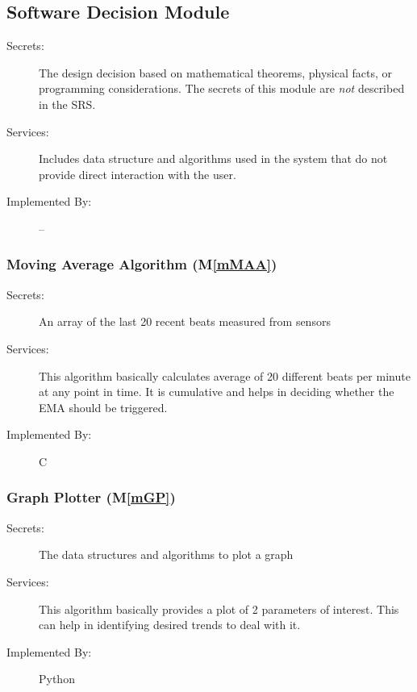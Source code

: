 \documentclass[12pt, titlepage]{article}
\newcommand{\mref}[1]{M\ref{#1}}
\begin{document}
\subsection{Software Decision Module}

\begin{description}
  \item[Secrets:] The design decision based on mathematical theorems, physical
    facts, or programming considerations. The secrets of this module are
    \emph{not} described in the SRS.
  \item[Services:] Includes data structure and algorithms used in the system that
    do not provide direct interaction with the user.
  \item[Implemented By:] --
\end{description}



\subsubsection{Moving Average Algorithm (\mref{mMAA})}

\begin{description}
  \item[Secrets:] An array of the last 20 recent beats measured from sensors
  \item[Services:] This algorithm basically calculates average of 20 different beats per minute at any point in time. It is cumulative and helps in deciding whether the EMA should be triggered.
  \item[Implemented By:] C
\end{description}

\subsubsection{Graph Plotter (\mref{mGP})}

\begin{description}
  \item[Secrets:] The data structures and algorithms to plot a graph
  \item[Services:] This algorithm basically provides a plot of 2 parameters of interest. This can help in identifying desired trends to deal with it.
  \item[Implemented By:] Python
\end{description}
\end{document}
